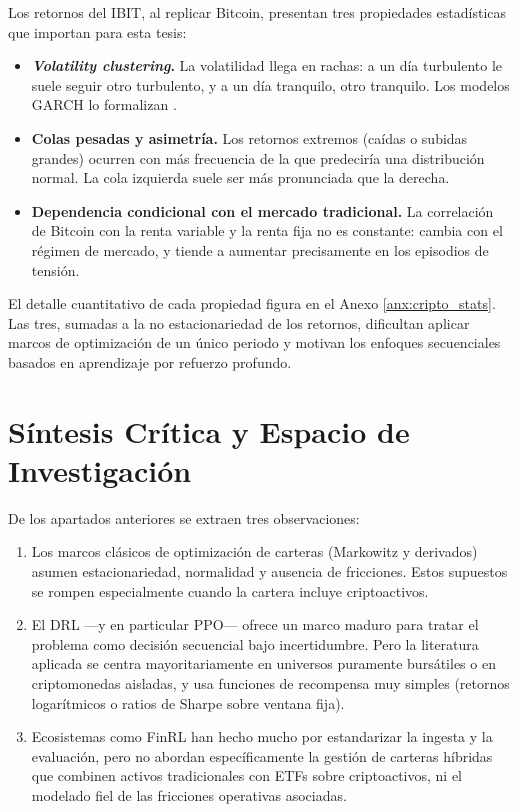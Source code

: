 \documentclass[IB,a4paper]{TFUOC}
\begin{document}
Los retornos del IBIT, al replicar Bitcoin, presentan tres propiedades estadísticas que importan para esta tesis:

\begin{itemize}
    \item \textbf{\textit{Volatility clustering}.} La volatilidad llega en rachas: a un día turbulento le suele seguir otro turbulento, y a un día tranquilo, otro tranquilo. Los modelos GARCH lo formalizan \citep{katsiampa2017,bollerslev1986garch}.
    \item \textbf{Colas pesadas y asimetría.} Los retornos extremos (caídas o subidas grandes) ocurren con más frecuencia de la que predeciría una distribución normal. La cola izquierda suele ser más pronunciada que la derecha.
    \item \textbf{Dependencia condicional con el mercado tradicional.} La correlación de Bitcoin con la renta variable y la renta fija no es constante: cambia con el régimen de mercado, y tiende a aumentar precisamente en los episodios de tensión.
\end{itemize}

El detalle cuantitativo de cada propiedad figura en el Anexo \ref{anx:cripto_stats}. Las tres, sumadas a la no estacionariedad de los retornos, dificultan aplicar marcos de optimización de un único periodo y motivan los enfoques secuenciales basados en aprendizaje por refuerzo profundo.

\section{Síntesis Crítica y Espacio de Investigación}
\label{sec:sintesis_critica}

De los apartados anteriores se extraen tres observaciones:

\begin{enumerate}
    \item Los marcos clásicos de optimización de carteras (Markowitz y derivados) asumen estacionariedad, normalidad y ausencia de fricciones. Estos supuestos se rompen especialmente cuando la cartera incluye criptoactivos.
    \item El DRL —y en particular PPO— ofrece un marco maduro para tratar el problema como decisión secuencial bajo incertidumbre. Pero la literatura aplicada se centra mayoritariamente en universos puramente bursátiles o en criptomonedas aisladas, y usa funciones de recompensa muy simples (retornos logarítmicos o ratios de Sharpe sobre ventana fija).
    \item Ecosistemas como FinRL han hecho mucho por estandarizar la ingesta y la evaluación, pero no abordan específicamente la gestión de carteras híbridas que combinen activos tradicionales con ETFs sobre criptoactivos, ni el modelado fiel de las fricciones operativas asociadas.
\end{enumerate}
\end{document}
